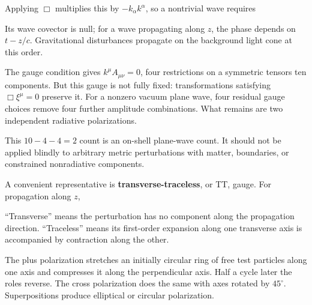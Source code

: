 \documentclass[
  11pt,
  letterpaper,
  oneside,
  openany]{scrbook}
\begin{document}
Applying \(\Box\) multiplies this by \(-k_\alpha k^\alpha\), so a
nontrivial wave requires

\begin{center}
\begingroup
{}
\ifdim\wd\grmathbox>\linewidth
\resizebox{\linewidth}{!}{\usebox{\grmathbox}}
\else\usebox{\grmathbox}\fi
\endgroup
\end{center}

Its wave covector is null; for a wave propagating along \(z\), the phase
depends on \(t-z/c\). Gravitational disturbances propagate on the
background light cone at this order.

The gauge condition gives \(k^\mu A_{\mu\nu}=0\), four restrictions on a
symmetric tensor\textquotesingle s ten components. But this gauge is not
fully fixed: transformations satisfying \(\Box\xi^\mu=0\) preserve it.
For a nonzero vacuum plane wave, four residual gauge choices remove four
further amplitude combinations. What remains are two independent
radiative polarizations.

This \(10-4-4=2\) count is an on-shell plane-wave count. It should not
be applied blindly to arbitrary metric perturbations with matter,
boundaries, or constrained nonradiative components.

A convenient representative is \textbf{transverse-traceless}, or TT,
gauge. For propagation along \(z\),

\begin{center}
\begingroup
{}
\ifdim\wd\grmathbox>\linewidth
\resizebox{\linewidth}{!}{\usebox{\grmathbox}}
\else\usebox{\grmathbox}\fi
\endgroup
\end{center}

``Transverse'' means the perturbation has no component along the
propagation direction. ``Traceless'' means its first-order expansion
along one transverse axis is accompanied by contraction along the other.

The plus polarization stretches an initially circular ring of free test
particles along one axis and compresses it along the perpendicular axis.
Half a cycle later the roles reverse. The cross polarization does the
same with axes rotated by \(45^\circ\). Superpositions produce
elliptical or circular polarization.
\end{document}

